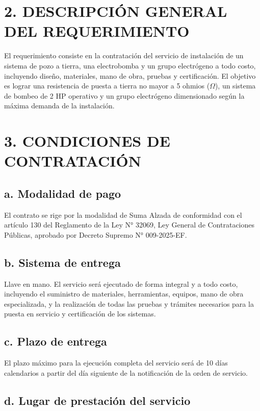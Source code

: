 \documentclass[12pt,a4paper]{article}
\begin{document}
\section*{2. DESCRIPCIÓN GENERAL DEL REQUERIMIENTO}

El requerimiento consiste en la contratación del servicio de instalación de un sistema de pozo a tierra, una electrobomba y un grupo electrógeno a todo costo, incluyendo diseño, materiales, mano de obra, pruebas y certificación. El objetivo es lograr una resistencia de puesta a tierra no mayor a 5 ohmios ($\Omega$), un sistema de bombeo de 2 HP operativo y un grupo electrógeno dimensionado según la máxima demanda de la instalación.

\section*{3. CONDICIONES DE CONTRATACIÓN}

\subsection*{a. Modalidad de pago}

El contrato se rige por la modalidad de Suma Alzada de conformidad con el artículo 130 del Reglamento de la Ley N° 32069, Ley General de Contrataciones Públicas, aprobado por Decreto Supremo N° 009-2025-EF.

\subsection*{b. Sistema de entrega}

Llave en mano. El servicio será ejecutado de forma integral y a todo costo, incluyendo el suministro de materiales, herramientas, equipos, mano de obra especializada, y la realización de todas las pruebas y trámites necesarios para la puesta en servicio y certificación de los sistemas.

\subsection*{c. Plazo de entrega}

El plazo máximo para la ejecución completa del servicio será de 10 días calendarios a partir del día siguiente de la notificación de la orden de servicio.

\subsection*{d. Lugar de prestación del servicio}
\end{document}
